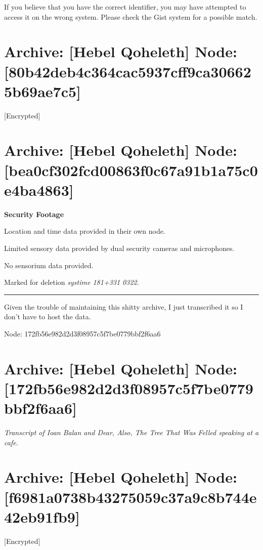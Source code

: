 If you believe that you have the correct identifier, you may have attempted to access it on the wrong system. Please check the Gist system for a possible match.

\hypertarget{archive-hebel-qoheleth-node-80b42deb4c364cac5937cff9ca306625b69ae7c5}{%
\section{Archive: {[}Hebel Qoheleth{]} \textbar{} Node: {[}80b42deb4c364cac5937cff9ca306625b69ae7c5{]}}\label{archive-hebel-qoheleth-node-80b42deb4c364cac5937cff9ca306625b69ae7c5}}

{[}Encrypted{]}

\hypertarget{archive-hebel-qoheleth-node-bea0cf302fcd00863f0c67a91b1a75c0e4ba4863}{%
\section{Archive: {[}Hebel Qoheleth{]} \textbar{} Node: {[}bea0cf302fcd00863f0c67a91b1a75c0e4ba4863{]}}\label{archive-hebel-qoheleth-node-bea0cf302fcd00863f0c67a91b1a75c0e4ba4863}}

\textbf{Security Footage}

Location and time data provided in their own node.

Limited sensory data provided by dual security cameras and microphones.

No sensorium data provided.

Marked for deletion \emph{systime 181+331 0322}.

\begin{center}\rule{0.5\linewidth}{\linethickness}\end{center}

Given the trouble of maintaining this shitty archive, I just transcribed it so I don't have to host the data.

Node: 172fb56e982d2d3f08957c5f7be0779bbf2f6aa6

\hypertarget{archive-hebel-qoheleth-node-172fb56e982d2d3f08957c5f7be0779bbf2f6aa6}{%
\section{Archive: {[}Hebel Qoheleth{]} \textbar{} Node: {[}172fb56e982d2d3f08957c5f7be0779bbf2f6aa6{]}}\label{archive-hebel-qoheleth-node-172fb56e982d2d3f08957c5f7be0779bbf2f6aa6}}

\emph{Transcript of Ioan Balan and Dear, Also, The Tree That Was Felled speaking at a cafe.}

\hypertarget{archive-hebel-qoheleth-node-f6981a0738b43275059c37a9c8b744e42eb91fb9}{%
\section{Archive: {[}Hebel Qoheleth{]} \textbar{} Node: {[}f6981a0738b43275059c37a9c8b744e42eb91fb9{]}}\label{archive-hebel-qoheleth-node-f6981a0738b43275059c37a9c8b744e42eb91fb9}}

{[}Encrypted{]}
